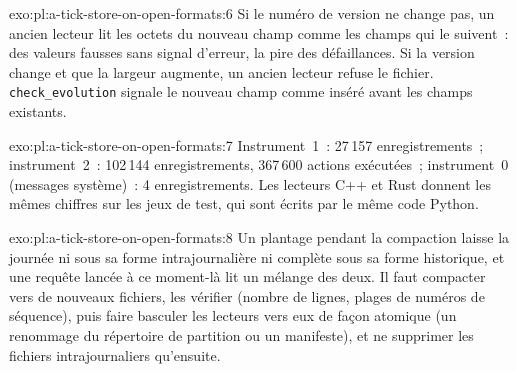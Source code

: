 \begin{solution}{exo:pl:a-tick-store-on-open-formats:6}
Si le numéro de version ne change pas, un ancien lecteur lit les octets du nouveau champ comme les champs qui le suivent~: des valeurs
fausses sans signal d'erreur, la pire des défaillances. Si la version change et que la largeur augmente, un ancien lecteur refuse le fichier. \texttt{check\_evolution} signale
le nouveau champ comme inséré avant les champs existants.
\end{solution}

\begin{solution}{exo:pl:a-tick-store-on-open-formats:7}
Instrument~1~: 27\,157 enregistrements~; instrument~2~: 102\,144 enregistrements, 367\,600 actions exécutées~; instrument~0 (messages système)~: 4
enregistrements. Les lecteurs C++ et Rust donnent les mêmes chiffres sur les jeux de test, qui sont écrits par le même code Python.
\end{solution}

\begin{solution}{exo:pl:a-tick-store-on-open-formats:8}
Un plantage pendant la compaction laisse la journée ni sous sa forme intrajournalière ni complète sous sa forme historique, et une requête
lancée à ce moment-là lit un mélange des deux. Il faut compacter vers de nouveaux fichiers, les vérifier (nombre de lignes, plages de numéros de séquence), puis faire basculer les lecteurs vers eux de façon atomique (un
renommage du répertoire de partition ou un manifeste), et ne supprimer les fichiers intrajournaliers qu'ensuite.
\end{solution}

